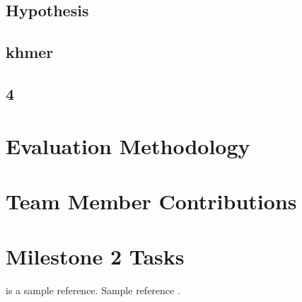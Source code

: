 \documentclass[preprint,nocopyrightspace]{sig-alternate}
\begin{document}
\subsection{Hypothesis}
\subsection{khmer}
\subsection{4}
\section{Evaluation Methodology}
\section{Team Member Contributions}
\section{Milestone 2 Tasks}

\citet{DBLP:conf/sc/Rubio-GonzalezNNDKSBIH13} is a sample reference.
Sample reference \cite{DBLP:conf/sc/Rubio-GonzalezNNDKSBIH13}.


\end{document}
